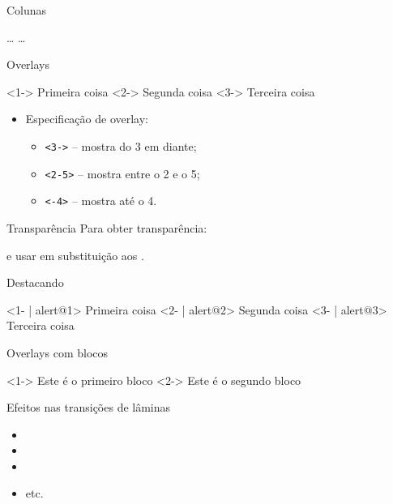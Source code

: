 \begin{frame}{Colunas}
\begin{LaTeXcode}[Colunas]
\LO[t]
 \nn
{}\Larg{5cm} \n
\dots \n
{}
 \nn
{}\Larg{5cm} \n
\dots \n
{}
 \nn
{}
\end{LaTeXcode}
\end{frame}

\begin{frame}{Overlays}
	\begin{LaTeXcode}[Overlays]
		 \n
		 Primeira coisa \n
		 Segunda coisa \n
		 Terceira coisa \n
		 \n
	\end{LaTeXcode}
	
	\begin{itemize}
	\item Especificação de overlay:
	\begin{itemize}
		\item \texttt{<3->} -- mostra do 3 em diante;
		\item \texttt{<2-5>} -- mostra entre o 2 e o 5;
		\item \texttt{<-4>} -- mostra até o 4.
	\end{itemize}
\end{itemize}
\end{frame}

\begin{frame}{Transparência}
Para obter transparência: 

  e usar   em substituição aos .
\end{frame}

\begin{frame}{Destacando}
\begin{LaTeXcode}[Destacando]
 \n
{} <1- | alert@1> Primeira coisa \n
{} <2- | alert@2> Segunda coisa \n
{} <3- | alert@3> Terceira coisa \n
{}
\end{LaTeXcode}
\end{frame}

\begin{frame}{Overlays com blocos}
\begin{LaTeXcode}
 \n
{}<1-> \n
Este é o primeiro bloco \n
{}
\nn
{}<2-> \n
Este é o segundo bloco \n
{} \n
{}
\end{LaTeXcode}
\end{frame}

\begin{frame}{Efeitos nas transições de lâminas}

\begin{itemize}
\item {}
\item {}
\item {}
\item etc.
\end{itemize}
\end{frame}
